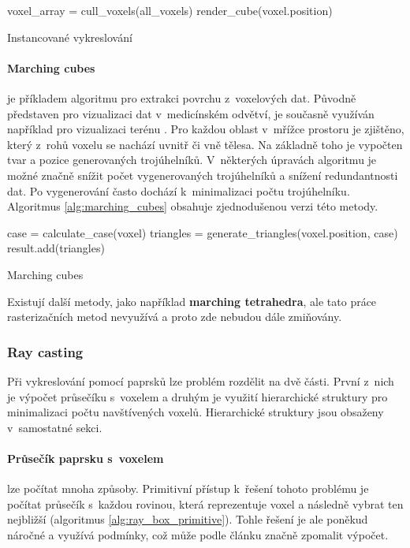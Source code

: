 \begin{center}
	\begin{czechalgorithm}[H] \label{alg:instanced_cube}
		voxel\_array = cull\_voxels(all\_voxels)\;
		 {
			render\_cube(voxel.position)\;
		}
		\caption{Instancované vykreslování}
	\end{czechalgorithm}
\end{center}

\paragraph{Marching cubes \cite{marching_cubes}} je příkladem algoritmu pro extrakci povrchu z~voxelových dat. Původně představen pro vizualizaci dat v~medicínském odvětví, je současně využíván například pro vizualizaci terénu \cite{nguyen_2008}. Pro každou oblast v~mřížce prostoru je zjištěno, který z~rohů voxelu se nachází uvnitř či vně tělesa. Na základně toho je vypočten tvar a pozice generovaných trojúhelníků. V~některých úpravách algoritmu je možné značně snížit počet vygenerovaných trojúhelníků a snížení redundantnosti dat. Po vygenerování často dochází k~minimalizaci počtu trojúhelníku. Algoritmus \ref{alg:marching_cubes} obsahuje zjednodušenou verzi této metody.

\begin{center}
	\begin{czechalgorithm}[H] \label{alg:marching_cubes}
		 {
			case = calculate\_case(voxel)\;
			triangles = generate\_triangles(voxel.position, case)\;
			result.add(triangles)\;
		}
		\caption{Marching cubes}
	\end{czechalgorithm}
\end{center}

Existují další metody, jako například \textbf{marching tetrahedra}, ale tato práce rasterizačních metod nevyužívá a proto zde nebudou dále zmiňovány.

\subsubsection{Ray casting} \label{sec:voxel_intersection}
Při vykreslování pomocí paprsků lze problém rozdělit na dvě části. První z~nich je výpočet průsečíku s~voxelem a druhým je využití hierarchické struktury pro minimalizaci počtu navštívených voxelů. Hierarchické struktury jsou obsaženy v~samostatné sekci.

\paragraph{Průsečík paprsku s~voxelem} lze počítat mnoha způsoby. Primitivní přístup k~řešení tohoto problému je počítat průsečík s~každou rovinou, která reprezentuje voxel a následně vybrat ten nejbližší (algoritmus \ref{alg:ray_box_primitive}). Tohle řešení je ale poněkud náročné a využívá podmínky, což může podle článku \cite{gpu_branch} značně zpomalit výpočet.

